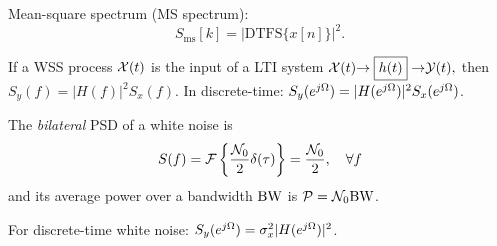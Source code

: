 Mean-square spectrum (MS spectrum):
\begin{equation}
S_{\textrm{ms}}[k] = |\textrm{DTFS}\{x[n]\}|^2.
\label{eq:msspectrumDef}
\end{equation}

If a WSS process ${\cal X}(t)$ is the input of a LTI system
$
{\cal X}(t) {\rightarrow\boxed{h(t)}\rightarrow}  {\cal Y}(t),
$ then $S_y(f)=|H(f)|^2 S_x(f)$.
In discrete-time: $
S_y(e^{j {\Omega}}) = |H(e^{j {\Omega}})|^2 S_x(e^{j {\Omega}})$.

The \emph{bilateral} PSD of a white noise is 
\begin{equation}
S(f) = {\cal F} \left\{ \frac {{\cal N}_0} 2 \delta(\tau) \right\} = \frac {{\cal N}_0} 2, \textrm{~~~} \forall f
\label{eq:psdWhiteNoise}
\end{equation}
and its average power over a bandwidth ${\textrm{BW}}$ is ${\cal P} = {\cal N}_0 {\textrm{BW}}$.

For discrete-time white noise: $S_y(e^{j {\Omega}}) = \sigma_x^2 |H(e^{j {\Omega}})|^2$.


